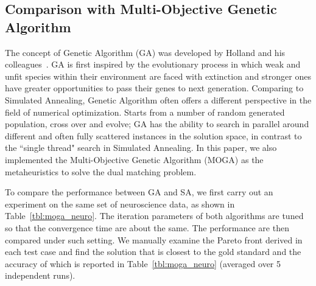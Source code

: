 \subsection{Comparison with Multi-Objective Genetic Algorithm}
The concept of Genetic Algorithm (GA) was developed by Holland and his colleagues~\cite{Holland1992}. GA is first inspired by the evolutionary process in which weak and unfit species within their environment are faced with extinction and stronger ones have greater opportunities to pass their genes to next generation. Comparing to Simulated Annealing, Genetic Algorithm often offers a different perspective in the field of numerical optimization. Starts from a number of random generated population, cross over and evolve; GA has the ability to search in parallel around different and often fully scattered instances in the solution space, in contrast to the ``single thread" search in Simulated Annealing. In this paper, we also implemented the Multi-Objective Genetic Algorithm (MOGA) as the metaheuristics to solve the dual matching problem.


To compare the performance between GA and SA, we first carry out an experiment on the same set of neuroscience data, as shown in Table~\ref{tbl:moga_neuro}. The iteration parameters of both algorithms are tuned so that the convergence time are about the same. The performance are then compared under such setting. We manually examine the Pareto front derived in each test case and find the solution that is closest to the gold standard and the accuracy of which is reported in Table~\ref{tbl:moga_neuro} (averaged over 5 independent runs).

